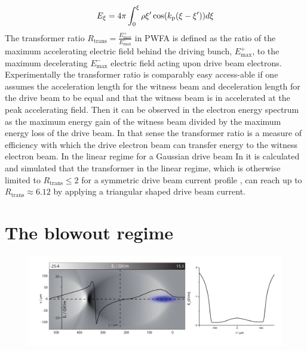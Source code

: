 \begin{equation}
E_\xi=4\pi \int_0^\xi \rho{\xi'}\cos(k_\mathrm{p}(\xi-\xi'))d\xi
\end{equation}
The transformer ratio $R_\mathrm{trans}=\frac{E_\mathrm{max}^+}{E_\mathrm{max}^-} $ in PWFA is defined as
the ratio of the maximum accelerating electric field
behind the driving bunch, $E_\mathrm{max}^+$, to the maximum decelerating $E_\mathrm{max}^-$
electric field acting upon drive beam electrons. Experimentally the transformer ratio is comparably easy access-able if one assumes the acceleration length for the witness beam and deceleration length for the drive beam to be equal and that the  witness beam is in accelerated at the peak accelerating field.
Then it can be observed in the electron energy spectrum as the maximum energy gain of the witness beam divided by the maximum energy loss of the drive beam. In that sense the transformer ratio is a measure of efficiency with which the drive electron beam can transfer energy to the witness electron beam. 
In the linear regime for a Gaussian drive beam 
In \cite{PhysRevLett.56.1252} it is calculated and simulated that the transformer in the linear regime, which is otherwise limited to $R_\mathrm{trans}\leq 2$ for a symmetric drive beam current profile \cite{bane1984wake}, can reach up to $R_\mathrm{trans}\approx 6.12$ by applying a triangular shaped drive beam current.
\section{The blowout regime}
\label{sec:Blowout_regime}


\begin{figure}
\includegraphics[width=1.0\textwidth]{simulations/images/edited/PWFA_Blowout_Ex.pdf}
\end{figure}

